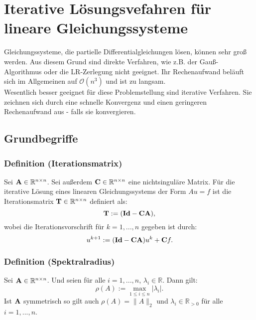 \chapter{Iterative Lösungsvefahren für lineare Gleichungssysteme}\label{c.IterativeVerfahren}

Gleichungssysteme, die partielle Differentialgleichungen lösen, können sehr groß werden. Aus diesem Grund sind direkte Verfahren, wie z.B. der Gauß-Algorithmus oder die LR-Zerlegung nicht geeignet. Ihr Rechenaufwand beläuft sich im Allgemeinen auf $\mathcal{O}(n^{3})$ und ist zu langsam.\\
Wesentlich besser geeignet für diese Problemstellung sind iterative Verfahren. Sie zeichnen sich durch eine schnelle Konvergenz und einen geringeren Rechenaufwand aus - falls sie konvergieren.

\section{Grundbegriffe}\label{s.Grundbegriffe}

\subsection{Definition (Iterationsmatrix)}\label{ss.Iterationsmatrix}

Sei ${\textbf{A}} \in \mathbb{R}^{n \times n}$. Sei außerdem ${\textbf{C}} \in \mathbb{R}^{n \times n}$ eine nichtsinguläre Matrix. Für die iterative Lösung eines linearen Gleichungssystems der Form $Au = f$ ist die Iterationsmatrix ${\textbf{T}} \in \mathbb{R}^{n \times n}$ definiert als:
\begin{equation}
{\textbf{T}} := ({\textbf{Id}} - {\textbf{C}} {\textbf{A}}),
\end{equation}
wobei die Iterationsvorschrift für $k=1,...,n$ gegeben ist durch:
\begin{equation}
u^{k+1} := ({\textbf{Id}} - {\textbf{C}} {\textbf{A}})u^{k} + {\textbf{C}} f.\label{eq.Iteratives Verfahren}
\end{equation}

\subsection{Definition (Spektralradius)}\label{s.Spektralradius}

Sei ${\textbf{A}} \in \mathbb{R}^{n \times n}$. Und seien für alle $i=1,...,n$, $\lambda_{i} \in \mathbb{R}$. Dann gilt:
\begin{equation}
\rho(A) := \max_{1 \le i \le n} | \lambda_{i} |.
\end{equation}
Ist ${\textbf{A}}$ symmetrisch so gilt auch $\rho(A) = \| A \|_{2}$ und $\lambda_{i} \in \mathbb{R}_{>0}$ für alle $i=1,...,n$.

